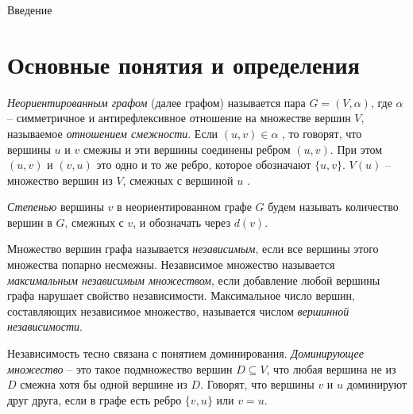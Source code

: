 \documentclass[bachelor, och, nir]{SCWorks}
\begin{document}




\tableofcontents

\intro
Введение

\section{Основные понятия и определения}
\textit{Неориентированным графом} (далее графом) называется пара $G = (V, \alpha)$, где $\alpha$ -- симметричное и антирефлексивное отношение на множестве вершин $V$, называемое \textit{отношением смежности}. Если $(u,v) \in \alpha$ , то говорят, что вершины $u$ и $v$ смежны и эти вершины соединены ребром $(u, v)$. При
этом $(u, v)$ и $(v, u)$ это одно и то же ребро, которое обозначают $\{u, v\}$. $V(u)$ -- множество вершин из $V$,
смежных с вершиной $u$ \cite{абросимов2009практические}.

\textit{Степенью} вершины $v$ в неориентированном графе $G$ будем называть количество вершин в $G$, смежных с $v$, и обозначать через $d(v)$.

Множество вершин графа называется \textit{независимым}, если все вершины
этого множества попарно несмежны. Независимое множество называется \textit{максимальным независимым множеством}, если добавление любой вершины графа нарушает свойство независимости. Максимальное число вершин, составляющих независимое множество, называется числом \textit{вершинной независимости}. 

Независимость тесно связана с понятием доминирования. 
\textit{Доминирующее множество} -- это такое подмножество вершин $D \subseteq V$, 
что любая вершина не из $D$ смежна хотя бы одной вершине из $D$. Говорят, 
что вершины $v$ и $u$ доминируют друг друга, если в графе есть ребро $\{v, u\}$ или
$v = u$. 
\end{document}
